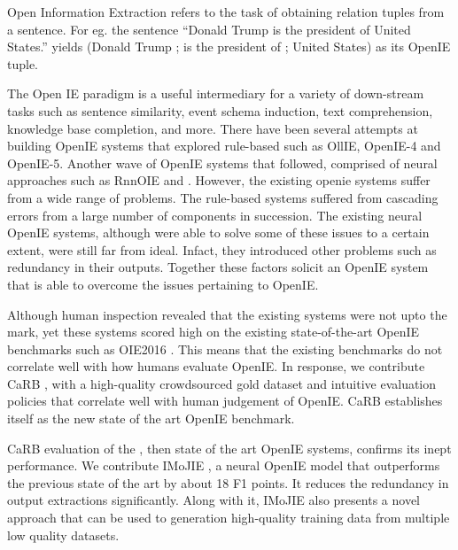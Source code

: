 \begin{comment}

  Skelaton

What is OpenIE - 1 line
list a few systems
problems with recent systems
new benchmark was needed
so we made carb, how is carb different
problems with openie models
imojie, mention perf improvements
errors made by imojie, add error analysis
mention mlil paper

\end{comment}

Open Information Extraction refers to the task of obtaining relation tuples from a sentence. For eg. the sentence ``Donald Trump is the president of United States.'' yields (Donald Trump ; is the president of ; United States) as its OpenIE tuple.

The Open IE paradigm is a useful intermediary for a variety of down-stream tasks such as sentence similarity, event schema induction, text comprehension, knowledge base completion, and more. There have been several attempts at building OpenIE systems that explored rule-based such as OllIE, OpenIE-4 and OpenIE-5. Another wave of OpenIE systems that followed, comprised of neural approaches such as RnnOIE and \citet{cui&al18}. However, the existing openie systems suffer from a wide range of problems. The rule-based systems suffered from cascading errors from a large number of components in succession. The existing neural OpenIE systems, although were able to solve some of these issues to a certain extent, were still far from ideal. Infact, they introduced other problems such as redundancy in their outputs. Together these factors solicit an OpenIE system that is able to overcome the issues pertaining to OpenIE.

Although human inspection revealed that the existing systems were not upto the mark, yet these systems scored high on the existing state-of-the-art OpenIE benchmarks such as OIE2016 \citep{OIE2016}. This means that the existing benchmarks do not correlate well with how humans evaluate OpenIE. In response, we contribute CaRB \citep{bhardwaj&al19}, with a high-quality crowdsourced gold dataset and intuitive evaluation policies that correlate well with human judgement of OpenIE. CaRB establishes itself as the new state of the art OpenIE benchmark.

CaRB evaluation of the \citet{cui&al18}, then state of the art OpenIE systems, confirms its inept performance. We contribute IMoJIE \citep{kolluru&al20}, a neural OpenIE model that outperforms the previous state of the art by about 18 F1 points. It reduces the redundancy in output extractions significantly. Along with it, IMoJIE also presents a novel approach that can be used to generation high-quality training data from multiple low quality datasets.

